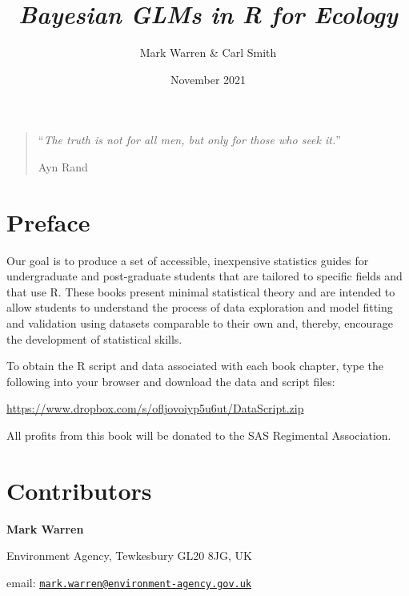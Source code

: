 \documentclass[
]{book}
\title{\emph{Bayesian GLMs in R for Ecology}}
\author{Mark Warren \& Carl Smith}
\date{November 2021}
\begin{document}
\frontmatter
\maketitle

{
\setcounter{tocdepth}{3}
\tableofcontents
}
\mainmatter
\hypertarget{section}{%
\chapter*{}\label{section}}

\begin{quote}
``\emph{The truth is not for all men, but only for those who seek it.}''

Ayn Rand
\end{quote}

\hypertarget{preface}{%
\chapter*{Preface}\label{preface}}

Our goal is to produce a set of accessible, inexpensive statistics
guides for undergraduate and post-graduate students that are tailored to
specific fields and that use R. These books present minimal statistical
theory and are intended to allow students to understand the process of
data exploration and model fitting and validation using datasets
comparable to their own and, thereby, encourage the development of
statistical skills.

To obtain the R script and data associated with each book chapter, type
the following into your browser and download the data and script files:

\url{https://www.dropbox.com/s/ofljovoiyp5u6ut/DataScript.zip}

All profits from this book will be donated to the SAS Regimental
Association.

\hypertarget{contributors}{%
\chapter*{Contributors}\label{contributors}}

\textbf{Mark Warren}

Environment Agency, Tewkesbury GL20 8JG, UK

email:
\href{mailto:mark.warren@environment-agency.gov.uk}{\nolinkurl{mark.warren@environment-agency.gov.uk}}
\end{document}
